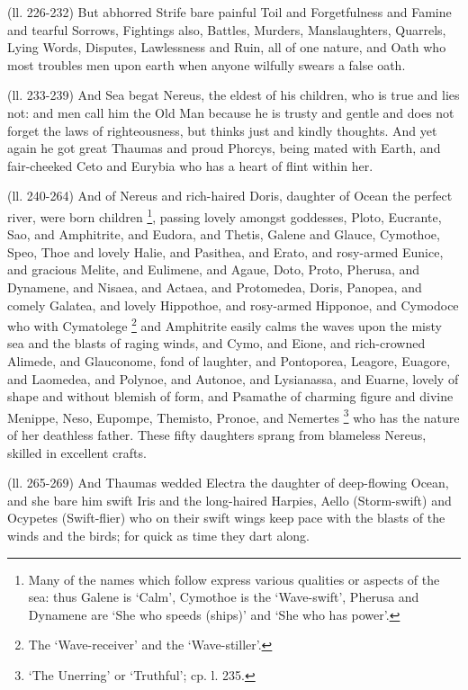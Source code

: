 (ll. 226-232) But abhorred Strife bare painful Toil and Forgetfulness and
Famine and tearful Sorrows, Fightings also, Battles, Murders, Manslaughters,
Quarrels, Lying Words, Disputes, Lawlessness and Ruin, all of one nature, and
Oath who most troubles men upon earth when anyone wilfully swears a false oath.

(ll. 233-239) And Sea begat Nereus, the eldest of his children, who is true and
lies not: and men call him the Old Man because he is trusty and gentle and does
not forget the laws of righteousness, but thinks just and kindly thoughts. And
yet again he got great Thaumas and proud Phorcys, being mated with Earth, and
fair-cheeked Ceto and Eurybia who has a heart of flint within her.

(ll. 240-264) And of Nereus and rich-haired Doris, daughter of Ocean the
perfect river, were born children \footnote{Many of the names which
follow express various qualities or aspects of the sea: thus Galene is
‘Calm’, Cymothoe is the ‘Wave-swift’, Pherusa and
Dynamene are ‘She who speeds (ships)’ and ‘She who has
power’.}, passing
lovely amongst goddesses, Ploto, Eucrante, Sao, and Amphitrite, and Eudora, and
Thetis, Galene and Glauce, Cymothoe, Speo, Thoe and lovely Halie, and Pasithea,
and Erato, and rosy-armed Eunice, and gracious Melite, and Eulimene, and Agaue,
Doto, Proto, Pherusa, and Dynamene, and Nisaea, and Actaea, and Protomedea,
Doris, Panopea, and comely Galatea, and lovely Hippothoe, and rosy-armed
Hipponoe, and Cymodoce who with Cymatolege \footnote{The
‘Wave-receiver’ and the ‘Wave-stiller’.} and
Amphitrite easily calms the waves upon the misty sea and the blasts of raging
winds, and Cymo, and Eione, and rich-crowned Alimede, and Glauconome, fond of
laughter, and Pontoporea, Leagore, Euagore, and Laomedea, and Polynoe, and
Autonoe, and Lysianassa, and Euarne, lovely of shape and without blemish of
form, and Psamathe of charming figure and divine Menippe, Neso, Eupompe,
Themisto, Pronoe, and Nemertes \footnote{‘The Unerring’
or ‘Truthful’; cp. l. 235.} who has the nature of her
deathless father. These fifty daughters sprang from blameless Nereus, skilled
in excellent crafts.

(ll. 265-269) And Thaumas wedded Electra the daughter of deep-flowing Ocean,
and she bare him swift Iris and the long-haired Harpies, Aello (Storm-swift)
and Ocypetes (Swift-flier) who on their swift wings keep pace with the blasts
of the winds and the birds; for quick as time they dart along.

